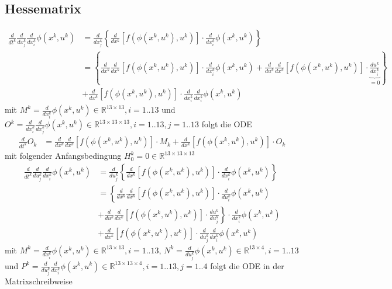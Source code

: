 \documentclass[12pt, a4paper]{scrartcl}
\begin{document}
\subsection*{Hessematrix}

\begin{align*}
\frac{d}{dt^k} \frac{d}{dx^k_j} \frac{d}{dx^k_i} \phi(x^k, u^k) &= \frac{d}{dx^k_j} \left\{ \frac{d}{dx^k} \left[f(\phi(x^k, u^k), u^k) \right] \cdot \frac{d}{dx^k_i}\phi(x^k, u^k) \right\}\\
&=\left\{\frac{d}{dx^k} \frac{d}{dx^k} \left[f(\phi(x^k, u^k), u^k) \right] \cdot \frac{d}{dx^k_i}\phi(x^k, u^k) + \frac{d}{du^k} \frac{d}{dx^k} \left[ f(\phi(x^k, u^k), u^k)  \right] \cdot \underbrace{\frac{du^k}{dx^k_i}}_{=0} \right\} \\
&+ \frac{d}{dx^k} \left[f(\phi(x^k, u^k), u^k) \right] \cdot \frac{d}{dx^k_i} \frac{d}{dx^k_i}\phi(x^k, u^k)
\end{align*}
mit $M^k = \frac{d}{dx^k_i} \phi(x^k, u^k) \in \mathbb{R}^{13 \times 13}, i = 1..13$ und $O^k = \frac{d}{dx^k_i} \frac{d}{dx^k_j} \phi(x^k, u^k) \in \mathbb{R}^{13 \times 13 \times 13}, i = 1..13, j=1..13$  folgt die ODE 
\begin{align*}
\frac{d}{dt^k} O_k &=\frac{d}{dx^k} \frac{d}{dx^k} \left[f(\phi(x^k, u^k), u^k) \right] \cdot M_k + \frac{d}{dx^k} \left[f(\phi(x^k, u^k), u^k) \right] \cdot O_k
\end{align*}
mit folgender Anfangsbedingung $H_0^k = 0 \in \mathbb{R}^{13 \times 13 \times 13}$
\begin{align*}
\frac{d}{dt^k} \frac{d}{du^k_j} \frac{d}{dx^k_i} \phi(x^k, u^k) &= \frac{d}{du^k_j} \left\{ \frac{d}{dx^k} \left[f(\phi(x^k, u^k), u^k) \right] \cdot \frac{d}{dx^k_i}\phi(x^k, u^k) \right\}\\
&= \left\{ \frac{d}{dx^k} \frac{d}{dx^k} \left[f(\phi(x^k, u^k), u^k) \right] \cdot \frac{d}{du^k_i}\phi(x^k, u^k) \right. \\
& \left. + \frac{d}{du^k} \frac{d}{dx^k} \left[f(\phi(x^k, u^k), u^k) \right] \cdot \frac{du^k}{du_j^k} \right\} \cdot \frac{d}{dx^k_i}\phi(x^k, u^k) \\
&+ \frac{d}{dx^k} \left[f(\phi(x^k, u^k), u^k)\right] \cdot \frac{d}{du^k_j} \frac{d}{dx^k_i}\phi(x^k, u^k) 
\end{align*}
mit $M^k = \frac{d}{dx^k_i} \phi(x^k, u^k) \in \mathbb{R}^{13 \times 13}, i = 1..13$, $N^k = \frac{d}{du^k_j} \phi(x^k, u^k) \in \mathbb{R}^{13 \times 4}, i = 1..13$ und $P^k = \frac{d}{du^k_j} \frac{d}{dx^k_i} \phi(x^k, u^k) \in \mathbb{R}^{13 \times 13 \times 4}, i = 1..13, j = 1..4$  folgt die ODE in der Matrixschreibweise
\end{document}

